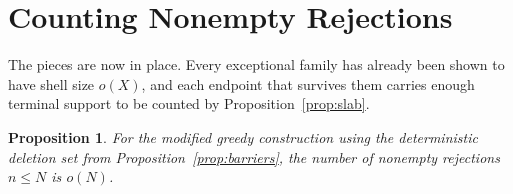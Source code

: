 \documentclass[11pt]{article}
\newtheorem{proposition}[theorem]{Proposition}
\theoremstyle{definition}
\newcommand{\1}{\mathbf 1}
\begin{document}
\section{Counting Nonempty Rejections}\label{sec:nonempty}

The pieces are now in place.  Every exceptional family has already been shown
to have shell size \(o(X)\), and each endpoint that survives them carries
enough terminal support to be counted by Proposition~\ref{prop:slab}.

\begin{proposition}\label{prop:nonempty}
For the modified greedy construction using the deterministic deletion set from
Proposition~\ref{prop:barriers}, the number of nonempty rejections \(n\le N\)
is \(o(N)\).
\end{proposition}
\end{document}
